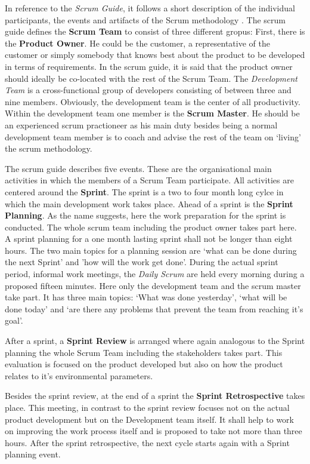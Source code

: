 \documentclass[a4paper,11pt,twoside]{article}
\begin{document}
In reference to the \textit{Scrum Guide}, it follows a short description of the individual participants, the events and artifacts of the Scrum methodology \cite{scrumguide}.
The scrum guide defines the \textbf{Scrum Team} to consist of three different gropus: First, there is the \textbf{Product Owner}. He could be the customer, a representative of the customer or simply somebody that knows best about the product to be developed in terms of requirements. In the scrum guide, it is said that the product owner should ideally be co-located with the rest of the Scrum Team. The \textit{Development Team} is a cross-functional group of developers consisting of between three and nine members. Obviously, the development team is the center of all productivity. Within the development team one member is the \textbf{Scrum Master}. He should be an experienced scrum practioneer as his main duty besides being a normal development team member is to coach and advise the rest of the team on `living' the scrum methodology.

The scrum guide describes five events. These are the organisational main activities in which the members of a Scrum Team participate. All activities are centered around the \textbf{Sprint}. The sprint is a two to four month long cylce in which the main development work takes place. Ahead of a sprint is the \textbf{Sprint Planning}. As the name suggests, here the work preparation for the sprint is conducted. The whole scrum team including the product owner takes part here. A sprint planning for a one month lasting sprint shall not be longer than eight hours. The two main topics for a planning session are `what can be done during the next Sprint' and 'how will the work get done'.
During the actual sprint period, informal work meetings, the \textit{Daily Scrum} are held every morning during a proposed fifteen minutes. Here only the development team and the scrum master take part. It has three main topics: `What was done yesterday', `what will be done today' and `are there any problems that prevent the team from reaching it's goal'.

After a sprint, a \textbf{Sprint Review} is arranged where again analogous to the Sprint planning the whole Scrum Team including the stakeholders takes part. This evaluation is focused on the product developed but also on how the product relates to it's environmental parameters.

Besides the sprint review, at the end of a sprint the \textbf{Sprint Retrospective} takes place. This meeting, in contrast to the sprint review focuses not on the actual product development but on the Development team itself. It shall help to work on improving the work process itself and is proposed to take not more than three hours. After the sprint retrospective, the next cycle starts again with a Sprint planning event.
\end{document}
